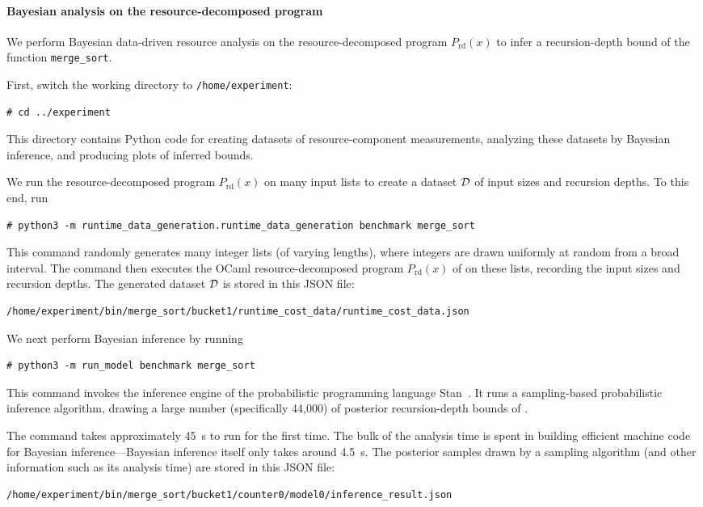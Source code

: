 \paragraph{Bayesian analysis on the resource-decomposed program}

We perform Bayesian data-driven resource analysis on the resource-decomposed
program $P_{\mathrm{rd}}(x)$ to infer a recursion-depth bound of the function
\texttt{merge\_sort}.

First, switch the working directory to \texttt{/home/experiment}:
\begin{verbatim}
# cd ../experiment
\end{verbatim}
%
This directory contains Python code for creating datasets of resource-component
measurements, analyzing these datasets by Bayesian inference, and producing
plots of inferred bounds.

We run the resource-decomposed program $P_{\mathrm{rd}}(x)$ on many input lists
to create a dataset $\mathcal{D}$ of input sizes and recursion depths.
%
To this end, run
\begin{verbatim}
# python3 -m runtime_data_generation.runtime_data_generation benchmark merge_sort
\end{verbatim}
%
This command randomly generates many integer lists (of varying lengths), where
integers are drawn uniformly at random from a broad interval.
%
The command then executes the OCaml resource-decomposed program
$P_{\mathrm{rd}}(x)$ of \mergesort{} on these lists, recording the input sizes
and recursion depths.
%
The generated dataset $\mathcal{D}$ is stored in this JSON file:
\begin{verbatim}
/home/experiment/bin/merge_sort/bucket1/runtime_cost_data/runtime_cost_data.json
\end{verbatim}

We next perform Bayesian inference by running
\begin{verbatim}
# python3 -m run_model benchmark merge_sort
\end{verbatim}
%
This command invokes the inference engine of the probabilistic programming
language Stan~\citep{Carpenter2017}.
%
It runs a sampling-based probabilistic inference algorithm, drawing a large
number (specifically 44,000) of posterior recursion-depth bounds of
\mergesort{}.

The command takes approximately \qty{45}{\second} to run for the first time.
%
The bulk of the analysis time is spent in building efficient machine code for
Bayesian inference---Bayesian inference itself only takes around
\qty{4.5}{\second}.
%
The posterior samples drawn by a sampling algorithm (and other information such
as its analysis time) are stored in this JSON file:
\begin{verbatim}
/home/experiment/bin/merge_sort/bucket1/counter0/model0/inference_result.json
\end{verbatim}

